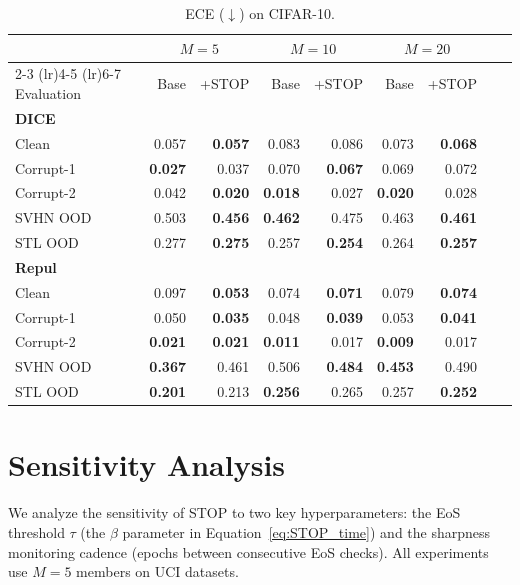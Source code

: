 \documentclass[sigconf]{acmart}
\begin{document}
\begin{table}[!ht]
\centering
\caption{ECE ($\downarrow$) on CIFAR-10.}
\label{tab:cifar_ece}
\scriptsize
\begin{tabular}{lrrrrrrrr}
\toprule
& \multicolumn{2}{c}{$M=5$} & \multicolumn{2}{c}{$M=10$} & \multicolumn{2}{c}{$M=20$} \\
\cmidrule(lr){2-3} \cmidrule(lr){4-5} \cmidrule(lr){6-7}
Evaluation 
& Base & +STOP & Base & +STOP & Base & +STOP \\
\midrule

\multicolumn{7}{l}{\textbf{DICE}} \\
Clean     & 0.057 & \textbf{0.057} & 0.083 & 0.086 & 0.073 & \textbf{0.068} \\
Corrupt-1 & \textbf{0.027} & 0.037 & 0.070 & \textbf{0.067} & 0.069 & 0.072 \\
Corrupt-2 & 0.042 & \textbf{0.020} & \textbf{0.018} & 0.027 & \textbf{0.020} & 0.028 \\
SVHN OOD  & 0.503 & \textbf{0.456} & \textbf{0.462} & 0.475 & 0.463 & \textbf{0.461} \\
STL OOD   & 0.277 & \textbf{0.275} & 0.257 & \textbf{0.254} & 0.264 & \textbf{0.257} \\

\midrule

\multicolumn{7}{l}{\textbf{Repul}} \\
Clean     & 0.097 & \textbf{0.053} & 0.074 & \textbf{0.071} & 0.079 & \textbf{0.074} \\
Corrupt-1 & 0.050 & \textbf{0.035} & 0.048 & \textbf{0.039} & 0.053 & \textbf{0.041} \\
Corrupt-2 & \textbf{0.021} & \textbf{0.021} & \textbf{0.011} & 0.017 & \textbf{0.009} & 0.017 \\
SVHN OOD  & \textbf{0.367} & 0.461 & 0.506 & \textbf{0.484} & \textbf{0.453} & 0.490 \\
STL OOD   & \textbf{0.201} & 0.213 & \textbf{0.256} & 0.265 & 0.257 & \textbf{0.252} \\

\bottomrule
\end{tabular}
\end{table}


\section{Sensitivity Analysis}
\label{app:sensitivity}

We analyze the sensitivity of STOP to two key hyperparameters: the EoS threshold $\tau$ (the $\beta$ parameter in Equation~\ref{eq:STOP_time}) and the sharpness monitoring cadence (epochs between consecutive EoS checks). All experiments use $M=5$ members on UCI datasets.
\end{document}
